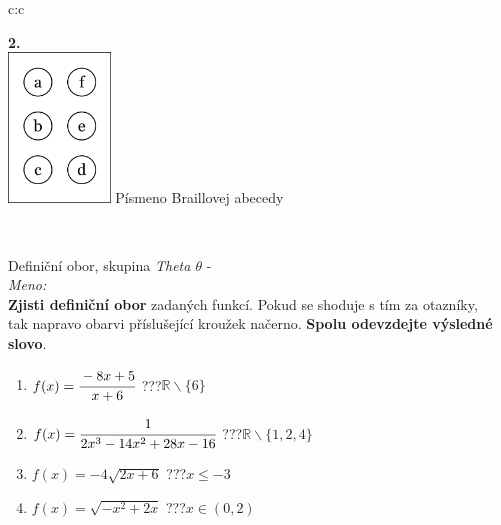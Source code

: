 \documentclass[10pt]{report}
\begin{document}
\begin{tabular}{c:c}
\begin{minipage}[c][99mm][t]{0.49\linewidth}
\begin{center}
\begin{minipage}{0.77\linewidth}
\begin{center}
\begin{varwidth}{\textwidth}
\begin{enumerate}
\end{enumerate}
\end{varwidth}
\end{center}
\end{minipage}
\begin{minipage}{0.20\linewidth}
\begin{center}
{\Huge\bfseries 2.} \\[2mm]
\includegraphics[height=40mm]{../images/braille.png}
{\small Písmeno Braillovej abecedy}
\end{center}
\end{minipage}
\end{center}
\end{minipage}
\\ \hdashline
\begin{minipage}[c][99mm][t]{0.49\linewidth}
\begin{center}
\vspace{7mm}
{\huge Definiční obor, skupina \textit{Theta $\theta$} -}\\[4.5mm]
\textit{Meno:}\phantom{xxxxxxxxxxxxxxxxxxxxxxxxxxxxxxxxxxxxxxxxxxxxxxxxxxxxxxxxxxxxxxxxx}\\[3.5mm]
\textbf{Zjisti definiční obor} zadaných funkcí. Pokud se shoduje s tím za otazníky,\\tak napravo obarvi příslušející kroužek načerno. \textbf{Spolu odevzdejte výsledné slovo}.\\[3mm]
\begin{minipage}{0.77\linewidth}
\begin{center}
\begin{varwidth}{\textwidth}
\begin{enumerate}
\normalsize
\item $f(x)=\cfrac{-8x+5}{x+6}$\quad \dotfill\; ???\;\dotfill \quad $\mathbb{R}\smallsetminus\{6\}$
\item $f(x)=\cfrac{1}{2x^3-14x^2+28x-16}$\quad \dotfill\; ???\;\dotfill \quad $\mathbb{R}\smallsetminus\{1,2,4\}$
\item $f(x)=-4\sqrt{2x+6}$\quad \dotfill\; ???\;\dotfill \quad $x\leq-3$
\item $f(x)=\sqrt{-x^2+2x}$\quad \dotfill\; ???\;\dotfill \quad $x\in(0 , 2)$

\end{enumerate}
\end{varwidth}
\end{center}
\end{minipage}
\end{center}
\end{minipage}
\end{tabular}
\end{document}
